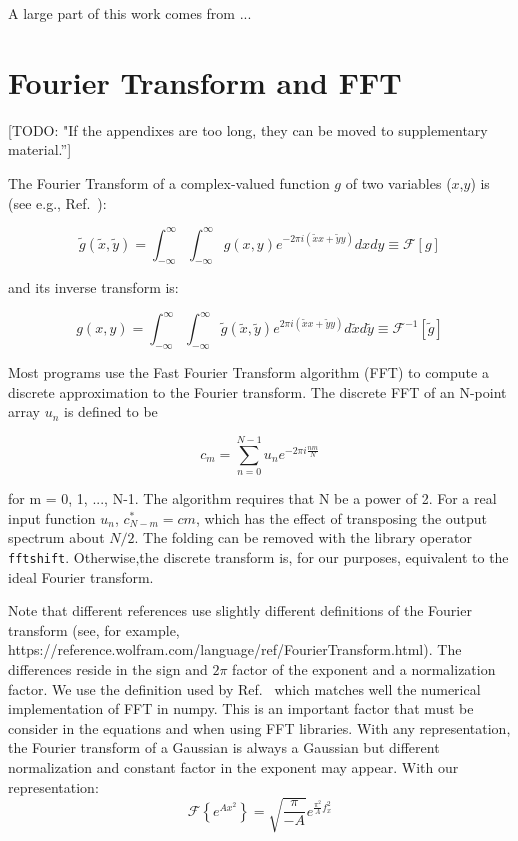 \documentclass{iucr}              %
\newcommand{\todo}[1]{{\color{red}[TODO: "#1'']}}
\newcommand{\inblue}[1]{{\color{blue}#1}}
\begin{document}
%
%
A large part of this work comes from ...

\appendix
\section{Fourier Transform and FFT}
\label{appendix_fft}

\todo{If the appendixes are too long, they can be moved to supplementary material.}

The Fourier Transform of a complex-valued function $g$ of two variables ($x$,$y$) is (see e.g., Ref.~\cite{goodmanfourier}): 

\begin{equation}
\tilde{g}(\tilde{x},\tilde{y}) = \int_{-\infty}^\infty \int_{-\infty}^\infty g(x,y) e^{-2 \pi i (\tilde{x}x + \tilde{y}y)} dx dy \equiv \mathcal{F}[g]
\end{equation}

and its inverse transform is: 

\begin{equation}
g(x,y) = \int_{-\infty}^\infty \int_{-\infty}^\infty \tilde{g}(\tilde{x},\tilde{y}) e^{2 \pi i (\tilde{x}x + \tilde{y}y)} d\tilde{x} d\tilde{y} \equiv \mathcal{F}^{-1}[\tilde{g}]
\end{equation}

Most programs use the Fast Fourier Transform algorithm (FFT) to compute a discrete approximation to the Fourier transform. The discrete FFT of an N-point array
$u_n$ is defined to be

\begin{equation}
 c_m = \sum_{n=0}^{N-1} u_n e^{-2 \pi i \frac{n m}{N}}
\end{equation}

for m = 0, 1, ..., N-1. The algorithm requires that N be a power of 2. For a real input function $u_n$, $c_{N-m}^\ast = cm$, which has the effect of transposing the output spectrum about $N/2$. The folding can be removed with the library operator {\tt fftshift}. Otherwise,the discrete transform is, for our purposes, equivalent to the ideal Fourier transform.

Note that different references use slightly different definitions of the Fourier transform (see, for example, \inblue{https://reference.wolfram.com/language/ref/FourierTransform.html}). The differences reside in the sign and $2 \pi$ factor of the exponent and a normalization factor. We use the definition used by Ref.~\cite{goodmanfourier} which matches well the numerical implementation of FFT in numpy. This is an important factor that must be consider in the equations and when using FFT libraries. With any representation, the Fourier transform of a Gaussian is always a Gaussian but different normalization and constant factor in the exponent may appear. With our representation:
\begin{equation}
\mathcal{F}\left\{ e^{A x^2} \right\} = \sqrt{\frac{\pi}{-A}} e^{\frac{\pi^2}{A} f_x^2}
\end{equation}
\end{document}
